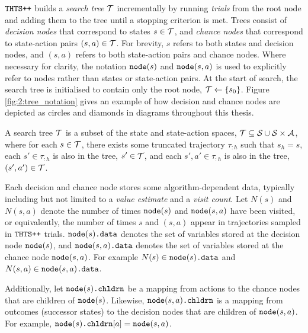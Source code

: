     ${\textnormal{\texttt{THTS++}}}$ builds a \textit{search tree} $\mathcal{T}$ incrementally by running \textit{trials} from the root node and adding them to the tree until a stopping criterion is met. Trees consist of \textit{decision nodes} that correspond to states $s\in\mathcal{T}$, and \textit{chance nodes} that correspond to state-action pairs $(s,a)\in\mathcal{T}$. For brevity, $s$ refers to both states and decision nodes, and $(s,a)$ refers to both state-action pairs and chance nodes. Where necessary for clarity, the notation ${\textnormal{\texttt{node}}}(s)$ and ${\textnormal{\texttt{node}}}(s,a)$ is used to explicitly refer to nodes rather than states or state-action pairs. At the start of search, the search tree is initialised to contain only the root node, $\mathcal{T}\leftarrow\{s_0\}$. Figure \ref{fig:2:tree_notation} gives an example of how decision and chance nodes are depicted as circles and diamonds in diagrams throughout this thesis.
    \begin{defn}
        \label{def:2:search_tree}
        A \textnormal{search tree} $\mathcal{T}$ is a subset of the state and state-action spaces, $\mathcal{T}\subseteq \mathcal{S} \cup \mathcal{S} \times \mathcal{A}$, where for each $s\in\mathcal{T}$, there exists some truncated trajectory $\tau_{:h}$ such that $s_h = s$, each $s'\in\tau_{:h}$ is also in the tree, $s'\in\mathcal{T}$, and each $s',a'\in\tau_{:h}$ is also in the tree, $(s',a')\in\mathcal{T}$.
    \end{defn}

    Each decision and chance node stores some algorithm-dependent data, typically including but not limited to a \textit{value estimate} and a \textit{visit count}. Let $N(s)$ and $N(s,a)$ denote the number of times ${\textnormal{\texttt{node}}}(s)$ and ${\textnormal{\texttt{node}}}(s,a)$ have been visited, or equivalently, the number of times $s$ and $(s,a)$ appear in trajectories sampled in ${\textnormal{\texttt{THTS++}}}$ trials. ${{\textnormal{\texttt{node}}}(s)\textnormal{\texttt{.data}}}$ denotes the set of variables stored at the decision node ${\textnormal{\texttt{node}}}(s)$, and ${{\textnormal{\texttt{node}}}(s,a)\textnormal{\texttt{.data}}}$ denotes the set of variables stored at the chance node ${\textnormal{\texttt{node}}}(s,a)$. For example $N(s)\in{{\textnormal{\texttt{node}}}(s)\textnormal{\texttt{.data}}}$ and $N(s,a)\in{{\textnormal{\texttt{node}}}(s,a)\textnormal{\texttt{.data}}}$.

    Additionally, let ${\textnormal{\texttt{node}}}(s){\textnormal{\texttt{.chldrn}}}$ be a mapping from actions to the chance nodes that are children of ${\textnormal{\texttt{node}}}(s)$. Likewise, ${\textnormal{\texttt{node}}}(s,a){\textnormal{\texttt{.chldrn}}}$ is a mapping from outcomes (successor states) to the decision nodes that are children of ${\textnormal{\texttt{node}}}(s,a)$. For example, ${\textnormal{\texttt{node}}}(s){\textnormal{\texttt{.chldrn}}}[a] = {\textnormal{\texttt{node}}}(s,a)$.








